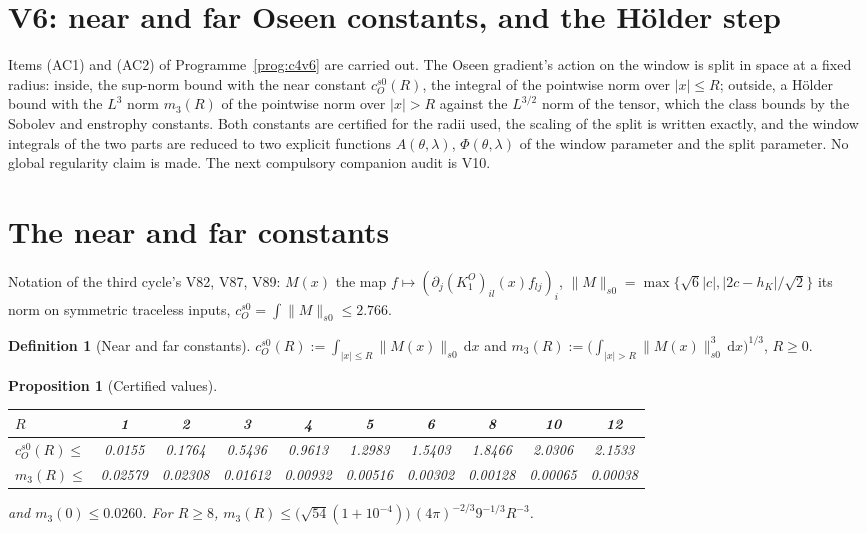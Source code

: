 \documentclass[11pt]{article}
\newcommand{\dd}{\,\mathrm d}
\theoremstyle{plain}
\newtheorem{proposition}[theorem]{Proposition}
\theoremstyle{definition}
\newtheorem{definition}[theorem]{Definition}
\theoremstyle{remark}
\begin{document}
\section{V6: near and far Oseen constants, and the H\"older step}
\label{sec:c4v6-entry}

Items (AC1) and (AC2) of Programme~\ref{prog:c4v6} are carried out.
The Oseen gradient's action on the window is split in space at a
fixed radius: inside, the sup-norm bound with the near constant
\(c_O^{s0}(R)\), the integral of the pointwise norm over \(|x|\le R\); outside, a
H\"older bound with the \(L^3\) norm \(m_3(R)\) of the pointwise norm over
\(|x|>R\) against the \(L^{3/2}\) norm of the tensor, which the class bounds
by the Sobolev and enstrophy constants.  Both constants are certified
for the radii used, the scaling of the split is written exactly, and
the window integrals of the two parts are reduced to two explicit
functions \(A(\theta,\lambda)\), \(\Phi(\theta,\lambda)\) of the window parameter and the split
parameter.  No global regularity claim is made.  The next compulsory
companion audit is V10.

\section{The near and far constants}
\label{sec:c4v6-constants}

Notation of the third cycle's V82, V87, V89: \(M(x)\) the map
\(f\mapsto(\partial_j(K^O_1)_{il}(x)f_{lj})_i\), \(\|M\|_{s0}=\max\{\sqrt6|c|,|2c-h_K|/\sqrt2\}\) its norm on
symmetric traceless inputs, \(c_O^{s0}=\int\|M\|_{s0}\le2.766\).

\begin{definition}[Near and far constants]
\label{def:c4v6-constants}
\(c_O^{s0}(R):=\int_{|x|\le R}\|M(x)\|_{s0}\dd x\) and \(m_3(R):=\bigl(\int_{|x|>R}\|M(x)\|_{s0}^3\dd x\bigr)^{1/3}\), \(R\ge0\).
\end{definition}

\begin{proposition}[Certified values]
\label{prop:c4v6-values}
\medskip
\begin{center}\small
\begin{tabular}{@{}lccccccccc@{}}
\toprule
\(R\) & 1 & 2 & 3 & 4 & 5 & 6 & 8 & 10 & 12\\
\midrule
\(c_O^{s0}(R)\le\) & 0.0155 & 0.1764 & 0.5436 & 0.9613 & 1.2983 & 1.5403 & 1.8466 & 2.0306 & 2.1533\\
\(m_3(R)\le\) & 0.02579 & 0.02308 & 0.01612 & 0.00932 & 0.00516 & 0.00302 & 0.00128 & 0.00065 & 0.00038\\
\bottomrule
\end{tabular}
\end{center}
\medskip
and \(m_3(0)\le0.0260\).  For \(R\ge8\), \(m_3(R)\le\bigl(\sqrt{54}(1+10^{-4})\bigr)\,(4\pi)^{-2/3}9^{-1/3}R^{-3}\).
\end{proposition}
\end{document}
